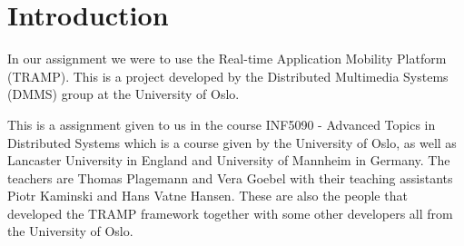\section{Introduction}
In our assignment we were to use the Real-time Application Mobility Platform (TRAMP). This is a project developed by the Distributed Multimedia Systems (DMMS) group at the University of Oslo.

This is a assignment given to us in the course INF5090 - Advanced Topics in Distributed Systems which is a course given by the University of Oslo, as well as Lancaster University in England and University of Mannheim in Germany. The teachers are Thomas Plagemann and Vera Goebel with their teaching assistants Piotr Kaminski and Hans Vatne Hansen. These are also the people that developed the TRAMP framework together with some other developers all from the University of Oslo.
